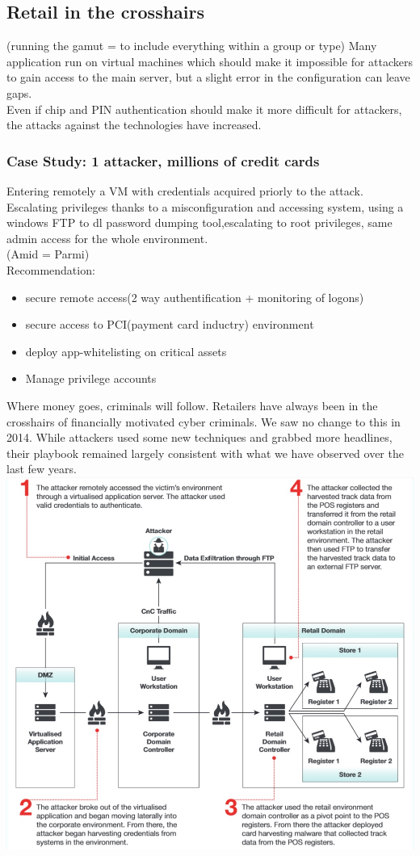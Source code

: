 \documentclass[10pt,a4paper]{report}
\begin{document}
\subsection{Retail in the crosshairs}
(running the gamut = to include everything within a group or type)
Many application run on virtual machines which should make it impossible for attackers to gain access to the main server, but a slight error in the configuration can leave gaps. \\
Even if chip and PIN authentication should make it more difficult for attackers, the attacks against the technologies have increased.
\subsubsection{Case Study: 1 attacker, millions of credit cards}
Entering remotely a VM with credentials acquired priorly to the attack. Escalating privileges thanks to a misconfiguration and accessing system, using a windows FTP to dl password dumping tool,escalating to root privileges, same admin access for the whole environment.\\
(Amid = Parmi)\\
Recommendation:\\
\begin{itemize}
\item secure remote access(2 way authentification + monitoring of logons)
\item secure access to PCI(payment card inductry) environment
\item deploy app-whitelisting on critical assets
\item Manage privilege accounts
\end{itemize}
Where money goes, criminals will follow. Retailers have 
always been in the crosshairs of financially motivated cyber criminals. We saw no 
change to this in 2014. While attackers used some new techniques and grabbed 
more headlines, their playbook remained largely consistent with what we have 
observed over the last few years.\\
\includegraphics[scale=0.5]{caseStudy.jpg}
\end{document}
